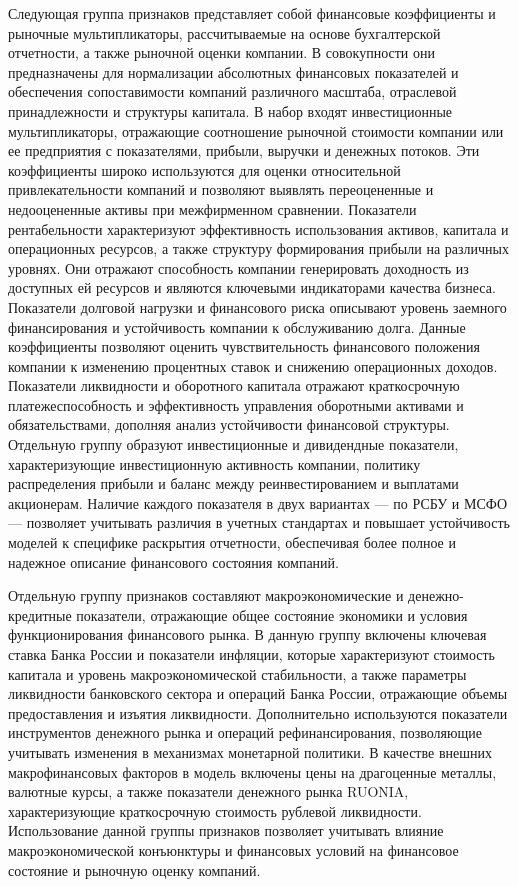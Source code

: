 \documentclass[
]{article}
\begin{document}
Следующая группа признаков представляет собой финансовые коэффициенты и рыночные мультипликаторы, рассчитываемые на основе бухгалтерской отчетности, а также рыночной оценки компании. В совокупности они предназначены для нормализации абсолютных финансовых показателей и обеспечения сопоставимости компаний различного масштаба, отраслевой принадлежности и структуры капитала. В набор входят инвестиционные мультипликаторы, отражающие соотношение рыночной стоимости компании или ее предприятия с показателями, прибыли, выручки и денежных потоков. Эти коэффициенты широко используются для оценки относительной привлекательности компаний и позволяют выявлять переоцененные и недооцененные активы при межфирменном сравнении. Показатели рентабельности характеризуют эффективность использования активов, капитала и операционных ресурсов, а также структуру формирования прибыли на различных уровнях. Они отражают способность компании генерировать доходность из доступных ей ресурсов и являются ключевыми индикаторами качества бизнеса. Показатели долговой нагрузки и финансового риска описывают уровень заемного финансирования и устойчивость компании к обслуживанию долга. Данные коэффициенты позволяют оценить чувствительность финансового положения компании к изменению процентных ставок и снижению операционных доходов. Показатели ликвидности и оборотного капитала отражают краткосрочную платежеспособность и эффективность управления оборотными активами и обязательствами, дополняя анализ устойчивости финансовой структуры. Отдельную группу образуют инвестиционные и дивидендные показатели, характеризующие инвестиционную активность компании, политику распределения прибыли и баланс между реинвестированием и выплатами акционерам. Наличие каждого показателя в двух вариантах --- по РСБУ и МСФО --- позволяет учитывать различия в учетных стандартах и повышает устойчивость моделей к специфике раскрытия отчетности, обеспечивая более полное и надежное описание финансового состояния компаний.

Отдельную группу признаков составляют макроэкономические и денежно-кредитные показатели, отражающие общее состояние экономики и условия функционирования финансового рынка. В данную группу включены ключевая ставка Банка России и показатели инфляции, которые характеризуют стоимость капитала и уровень макроэкономической стабильности, а также параметры ликвидности банковского сектора и операций Банка России, отражающие объемы предоставления и изъятия ликвидности. Дополнительно используются показатели инструментов денежного рынка и операций рефинансирования, позволяющие учитывать изменения в механизмах монетарной политики. В качестве внешних макрофинансовых факторов в модель включены цены на драгоценные металлы, валютные курсы, а также показатели денежного рынка RUONIA, характеризующие краткосрочную стоимость рублевой ликвидности. Использование данной группы признаков позволяет учитывать влияние макроэкономической конъюнктуры и финансовых условий на финансовое состояние и рыночную оценку компаний.
\end{document}

